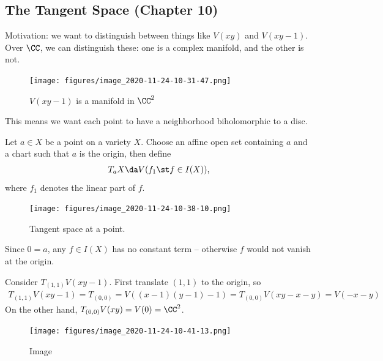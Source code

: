 \hypertarget{the-tangent-space-chapter-10}{%
\subsection{The Tangent Space (Chapter
10)}\label{the-tangent-space-chapter-10}}

Motivation: we want to distinguish between things like \(V(xy)\) and
\(V(xy-1)\). Over \(\CC\), we can distinguish these: one is a complex
manifold, and the other is not.

\begin{figure}
\centering
\texttt{[image: figures/image\_2020-11-24-10-31-47.png]}
\caption{\(V(xy-1)\) is a manifold in \(\CC^2\)}
\end{figure}

This means we want each point to have a neighborhood biholomorphic to a
disc.

\begin{definition}

Let \(a\in X\) be a point on a variety \(X\). Choose an affine open set
containing \(a\) and a chart such that \(a\) is the origin, then define
\begin{align*}  
T_a X \da V(f_1 \st f\in I(X))
,\end{align*} where \(f_1\) denotes the linear part of \(f\).

\begin{figure}
\centering
\texttt{[image: figures/image\_2020-11-24-10-38-10.png]}
\caption{Tangent space at a point.}
\end{figure}

\end{definition}

\begin{remark}

Since \(0=a\), any \(f\in I(X)\) has no constant term -- otherwise \(f\)
would not vanish at the origin.

\end{remark}

\begin{example}[?]

Consider \(T_{(1, 1)} V(xy-1)\). First translate \((1, 1)\) to the
origin, so
\begin{align*}
T_{(1, 1)} V(xy-1) = T_{(0, 0)} = V((x-1)(y-1) - 1) = T_{(0, 0)} V(xy-x-y) = V(-x-y)
\end{align*} On the other hand, \(T_{(0, 0)} V(xy) = V(0) = \CC^2\).

\begin{figure}
\centering
\texttt{[image: figures/image\_2020-11-24-10-41-13.png]}
\caption{Image}
\end{figure}

\end{example}

